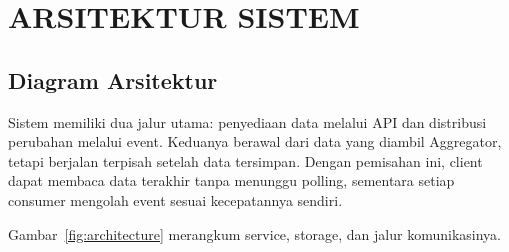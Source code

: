 \chapter{ARSITEKTUR SISTEM}

\section{Diagram Arsitektur}
Sistem memiliki dua jalur utama: penyediaan data melalui API dan distribusi perubahan melalui event. Keduanya berawal dari data yang diambil Aggregator, tetapi berjalan terpisah setelah data tersimpan. Dengan pemisahan ini, client dapat membaca data terakhir tanpa menunggu polling, sementara setiap consumer mengolah event sesuai kecepatannya sendiri.

Gambar~\ref{fig:architecture} merangkum service, storage, dan jalur komunikasinya.


